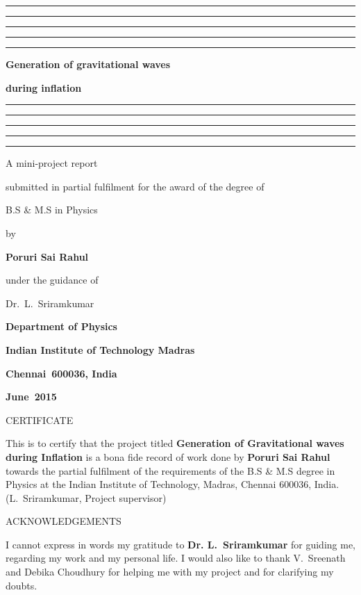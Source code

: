 \documentclass[12pt,a4paper,oneside]{book}
\begin{document}

\baselineskip 20pt




\thispagestyle{empty}
\topskip 15pt
\hrule\hrule\hrule\hrule\hrule
\vskip 20pt
\centerline{\Huge \bf Generation of gravitational waves} 
\vskip 15pt
\centerline{\Huge \bf during inflation} 
\vskip 20pt
\hrule\hrule\hrule\hrule\hrule
\vskip 30pt
\centerline{\Large A mini-project report}
\vskip 8pt
\centerline{\Large submitted in partial fulfilment 
for the award of the degree of}
\vskip 8pt
\centerline{\Large B.S \& M.S in Physics}
\vskip 8pt
\centerline{\Large by}
\vskip 8pt
\centerline{\Large \bf Poruri Sai Rahul}
\vskip 8pt
\centerline{\Large under the guidance of}
\vskip 8pt
\centerline{\Large  Dr.~L.~Sriramkumar}
\vskip 30pt 
\begin{center}
\end{center}
\vskip 8pt 
\centerline{\Large \bf Department of Physics}
\vskip 8pt 
\centerline{\Large \bf Indian Institute of Technology Madras}
\vskip 8pt 
\centerline{\Large \bf Chennai~600036, India}
\vskip 8pt
\centerline{\Large \bf June~2015}

\newpage\topskip 40pt
\centerline{\Large CERTIFICATE}
\thispagestyle{empty}
\vskip 20pt\noindent 
This is to certify that the project titled {\bf Generation of Gravitational
waves during Inflation} is a bona fide record of work done by 
{\bf Poruri Sai Rahul} towards the partial fulfilment of the 
requirements of the B.S \& M.S degree in Physics at the Indian 
Institute of Technology, Madras, Chennai 600036, India.
\vskip 120pt
\hspace{240pt}(L.~Sriramkumar, Project supervisor)


\newpage\topskip 40pt
\thispagestyle{empty}
\centerline{\Large ACKNOWLEDGEMENTS}
\vskip 20pt\noindent 

I cannot express in words my gratitude to {\bf Dr. L.~Sriramkumar} 
for guiding me, regarding my work and my personal life. I would also
like to thank V.~Sreenath and Debika Choudhury for helping me 
with my project and for clarifying my doubts.
\end{document}
